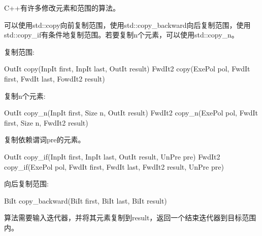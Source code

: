 
C++有许多修改元素和范围的算法。


可以使用std::copy向前复制范围，使用std::copy\_backward向后复制范围，使用std::copy\_if有条件地复制范围。若要复制n个元素，可以使用std::copy\_n。

复制范围:

\begin{cpp}
OutIt copy(InpIt first, InpIt last, OutIt result)
FwdIt2 copy(ExePol pol, FwdIt first, FwdIt last, FowdIt2 result)
\end{cpp}

复制n个元素:

\begin{cpp}
OutIt copy_n(InpIt first, Size n, OutIt result)
FwdIt2 copy_n(ExePol pol, FwdIt first, Size n, FwdIt2 result)
\end{cpp}

复制依赖谓词pre的元素。

\begin{cpp}
OutIt copy_if(InpIt first, InpIt last, OutIt result, UnPre pre)
FwdIt2 copy_if(ExePol pol, FwdIt first, FwdIt last, FwdIt2 result, UnPre pre)
\end{cpp}

向后复制范围:

\begin{cpp}
BiIt copy_backward(BiIt first, BiIt last, BiIt result)
\end{cpp}

算法需要输入迭代器，并将其元素复制到result，返回一个结束迭代器到目标范围内。




